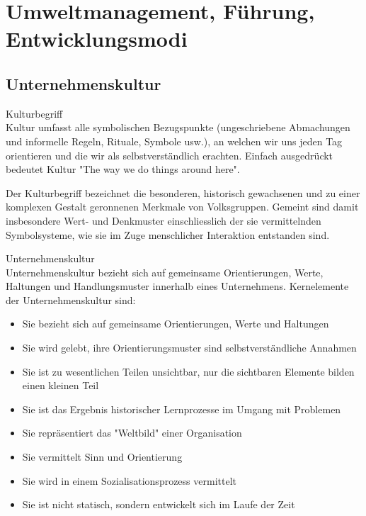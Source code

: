 \section{Umweltmanagement, Führung, Entwicklungsmodi}

\subsection{Unternehmenskultur}

\begin{definition}{Kulturbegriff}\\
Kultur umfasst alle symbolischen Bezugspunkte (ungeschriebene Abmachungen und informelle Regeln, Rituale, Symbole usw.), an welchen wir uns jeden Tag orientieren und die wir als selbstverständlich erachten. Einfach ausgedrückt bedeutet Kultur "The way we do things around here".

Der Kulturbegriff bezeichnet die besonderen, historisch gewachsenen und zu einer komplexen Gestalt geronnenen Merkmale von Volksgruppen. Gemeint sind damit insbesondere Wert- und Denkmuster einschliesslich der sie vermittelnden Symbolsysteme, wie sie im Zuge menschlicher Interaktion entstanden sind.
\end{definition}

\begin{definition}{Unternehmenskultur}\\
Unternehmenskultur bezieht sich auf gemeinsame Orientierungen, Werte, Haltungen und Handlungsmuster innerhalb eines Unternehmens. Kernelemente der Unternehmenskultur sind:
\begin{itemize}
    \item Sie bezieht sich auf gemeinsame Orientierungen, Werte und Haltungen
    \item Sie wird gelebt, ihre Orientierungsmuster sind selbstverständliche Annahmen
    \item Sie ist zu wesentlichen Teilen unsichtbar, nur die sichtbaren Elemente bilden einen kleinen Teil
    \item Sie ist das Ergebnis historischer Lernprozesse im Umgang mit Problemen
    \item Sie repräsentiert das "Weltbild" einer Organisation
    \item Sie vermittelt Sinn und Orientierung
    \item Sie wird in einem Sozialisationsprozess vermittelt
    \item Sie ist nicht statisch, sondern entwickelt sich im Laufe der Zeit
\end{itemize}
\end{definition}

